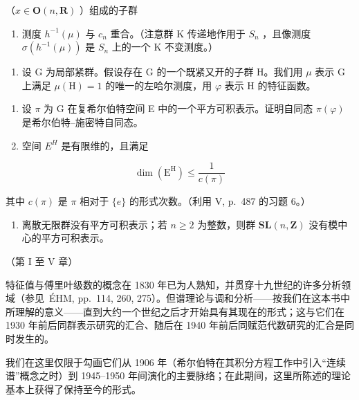 （\(x\in \mathbf{O}(n,\mathbf{R})\) ）组成的子群

\begin{enumerate}
\def\labelenumi{\alph{enumi})}
\setcounter{enumi}{7}
\tightlist
\item
  测度 \(h^{-1}(\mu)\) 与 \(c_{n}\) 重合。（注意群 K 传递地作用于 \(S_{n}\) ，且像测度 \(\sigma(h^{-1}(\mu))\) 是 \(S_{n}\) 上的一个 K 不变测度。）
\end{enumerate}

\begin{enumerate}
\def\labelenumi{\arabic{enumi})}
\setcounter{enumi}{31}
\tightlist
\item
  设 G 为局部紧群。假设存在 G 的一个既紧又开的子群 H。我们用 \(\mu\) 表示 G 上满足 \(\mu(\mathrm{H}) = 1\) 的唯一的左哈尔测度，用 \(\varphi\) 表示 H 的特征函数。
\end{enumerate}

\begin{enumerate}
\def\labelenumi{\alph{enumi})}
\item
  设 \(\pi\) 为 G 在复希尔伯特空间 E 中的一个平方可积表示。证明自同态 \(\pi(\varphi)\) 是希尔伯特–施密特自同态。
\item
  空间 \(E^{H}\) 是有限维的，且满足
\end{enumerate}

\[
\dim (\mathrm{E} ^ {\mathrm{H}}) \leqslant \frac {1}{c (\pi)}
\]

其中 \(c(\pi)\) 是 \(\pi\) 相对于 \(\{e\}\) 的形式次数。（利用 V, p.~487 的习题 6。）

\begin{enumerate}
\def\labelenumi{\alph{enumi})}
\setcounter{enumi}{2}
\tightlist
\item
  离散无限群没有平方可积表示；若 \(n \geqslant 2\) 为整数，则群 \(\mathbf{SL}(n, \mathbf{Z})\) 没有模中心的平方可积表示。
\end{enumerate}


（第 I 至 V 章）

特征值与傅里叶级数的概念在 1830 年已为人熟知，并贯穿十九世纪的许多分析领域（参见~ÉHM, pp.~114, 260, 275）。但谱理论与调和分析——按我们在这本书中所理解的意义——直到大约一个世纪之后才开始具有其现在的形式；这与它们在 1930 年前后同群表示研究的汇合、随后在 1940 年前后同赋范代数研究的汇合是同时发生的。

我们在这里仅限于勾画它们从 1906 年（希尔伯特在其积分方程工作中引入“连续谱”概念之时）到 1945–1950 年间演化的主要脉络；在此期间，这里所陈述的理论基本上获得了保持至今的形式。

